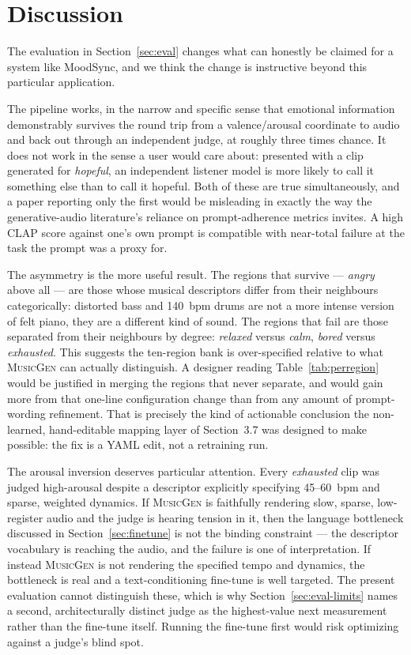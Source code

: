 \documentclass[11pt]{article}
\newcommand{\musicgen}{\textsc{MusicGen}}
\begin{document}
\section{Discussion}

The evaluation in Section~\ref{sec:eval} changes what can honestly be claimed for a system like MoodSync, and we think the change is instructive beyond this particular application.

The pipeline works, in the narrow and specific sense that emotional information demonstrably survives the round trip from a valence/arousal coordinate to audio and back out through an independent judge, at roughly three times chance. It does not work in the sense a user would care about: presented with a clip generated for \emph{hopeful}, an independent listener model is more likely to call it something else than to call it hopeful. Both of these are true simultaneously, and a paper reporting only the first would be misleading in exactly the way the generative-audio literature's reliance on prompt-adherence metrics invites. A high CLAP score against one's own prompt is compatible with near-total failure at the task the prompt was a proxy for.

The asymmetry is the more useful result. The regions that survive --- \emph{angry} above all --- are those whose musical descriptors differ from their neighbours categorically: distorted bass and 140~bpm drums are not a more intense version of felt piano, they are a different kind of sound. The regions that fail are those separated from their neighbours by degree: \emph{relaxed} versus \emph{calm}, \emph{bored} versus \emph{exhausted}. This suggests the ten-region bank is over-specified relative to what \musicgen{} can actually distinguish. A designer reading Table~\ref{tab:perregion} would be justified in merging the regions that never separate, and would gain more from that one-line configuration change than from any amount of prompt-wording refinement. That is precisely the kind of actionable conclusion the non-learned, hand-editable mapping layer of Section~3.7 was designed to make possible: the fix is a YAML edit, not a retraining run.

The arousal inversion deserves particular attention. Every \emph{exhausted} clip was judged high-arousal despite a descriptor explicitly specifying 45--60~bpm and sparse, weighted dynamics. If \musicgen{} is faithfully rendering slow, sparse, low-register audio and the judge is hearing tension in it, then the language bottleneck discussed in Section~\ref{sec:finetune} is not the binding constraint --- the descriptor vocabulary is reaching the audio, and the failure is one of interpretation. If instead \musicgen{} is not rendering the specified tempo and dynamics, the bottleneck is real and a text-conditioning fine-tune is well targeted. The present evaluation cannot distinguish these, which is why Section~\ref{sec:eval-limits} names a second, architecturally distinct judge as the highest-value next measurement rather than the fine-tune itself. Running the fine-tune first would risk optimizing against a judge's blind spot.
\end{document}
